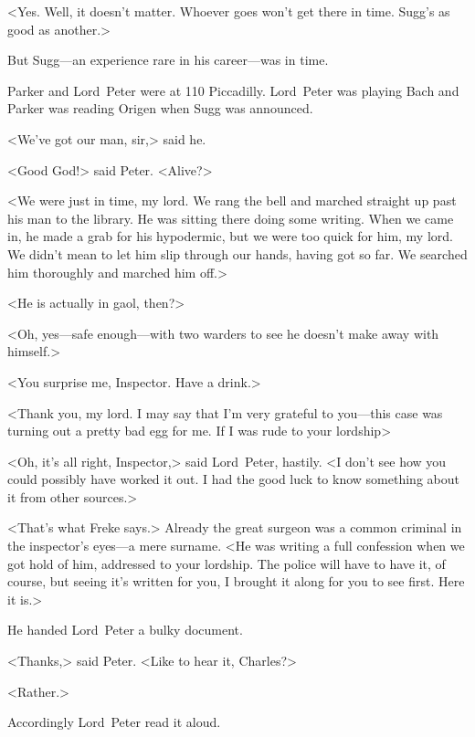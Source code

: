 <Yes. Well, it doesn't matter. Whoever goes won't get there in time. Sugg's as good as another.>

But Sugg—an experience rare in his career—was in time.

Parker and Lord~Peter were at 110 Piccadilly. Lord~Peter was playing Bach and Parker was reading Origen when Sugg was announced.

<We've got our man, sir,> said he.

<Good God!> said Peter. <Alive?>

<We were just in time, my lord. We rang the bell and marched straight up past his man to the library. He was sitting there doing some writing. When we came in, he made a grab for his hypodermic, but we were too quick for him, my lord. We didn't mean to let him slip through our hands, having got so far. We searched him thoroughly and marched him off.>

<He is actually in gaol, then?>

<Oh, yes—safe enough—with two warders to see he doesn't make away with himself.>

<You surprise me, Inspector. Have a drink.>

<Thank you, my lord. I may say that I'm very grateful to you—this case was turning out a pretty bad egg for me. If I was rude to your lordship\longdash>

<Oh, it's all right, Inspector,> said Lord~Peter, hastily. <I don't see how you could possibly have worked it out. I had the good luck to know something about it from other sources.>

<That's what Freke says.> Already the great surgeon was a common criminal in the inspector's eyes—a mere surname. <He was writing a full confession when we got hold of him, addressed to your lordship. The police will have to have it, of course, but seeing it's written for you, I brought it along for you to see first. Here it is.>

He handed Lord~Peter a bulky document.

<Thanks,> said Peter. <Like to hear it, Charles?>

<Rather.>

Accordingly Lord~Peter read it aloud.